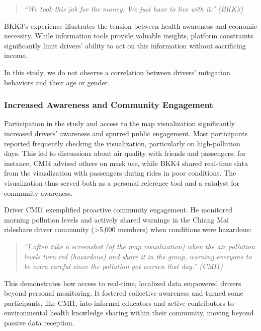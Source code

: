 \begin{quote}
  \em
    ``We took this job for the money. We just have to live with it.'' (BKK3)
\end{quote}

BKK3's experience illustrates the tension between health awareness and economic necessity.
While information tools provide valuable insights, platform constraints significantly limit drivers' ability to act on this information without sacrificing income.

In this study, we do not observe a correlation between drivers' mitigation behaviors and their age or gender.

\subsubsection{Increased Awareness and Community Engagement}
Participation in the study and access to the map visualization significantly increased drivers' awareness and spurred public engagement.
Most participants reported frequently checking the visualization, particularly on high-pollution days.
This led to discussions about air quality with friends and passengers; for instance, CMI4 advised others on mask use, while BKK4 shared real-time data from the visualization with passengers during rides in poor conditions.
The visualization thus served both as a personal reference tool and a catalyst for community awareness.

Driver CMI1 exemplified proactive community engagement.
He monitored morning pollution levels and actively shared warnings in the Chiang Mai rideshare driver community (>5,000 members) when conditions were hazardous:

\begin{quote}
  \em
 ``I often take a screenshot (of the map visualization) when the air pollution levels turn red (hazardous) and share it in the group, warning everyone to be extra careful since the pollution got worsen that day.'' (CMI1)
\end{quote}

This demonstrates how access to real-time, localized data empowered drivers beyond personal monitoring.
It fostered collective awareness and turned some participants, like CMI1, into informal educators and active contributors to environmental health knowledge sharing within their community, moving beyond passive data reception.

